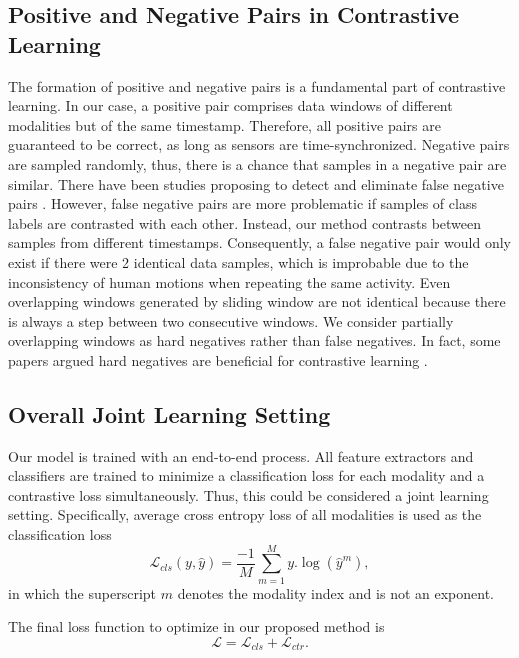 \documentclass[conference]{IEEEtran}
\begin{document}
\subsection{Positive and Negative Pairs in Contrastive Learning}
The formation of positive and negative pairs is a fundamental part of contrastive learning. In our case, a positive pair comprises data windows of different modalities but of the same timestamp. Therefore, all positive pairs are guaranteed to be correct, as long as sensors are time-synchronized. Negative pairs are sampled randomly, thus, there is a chance that samples in a negative pair are similar. There have been studies proposing to detect and eliminate false negative pairs \cite{Huynh2022,Wang2023}. However, false negative pairs are more problematic if samples of class labels are contrasted with each other. Instead, our method contrasts between samples from different timestamps. Consequently, a false negative pair would only exist if there were 2 identical data samples, which is improbable due to the inconsistency of human motions when repeating the same activity. Even overlapping windows generated by sliding window are not identical because there is always a step between two consecutive windows. We consider partially overlapping windows as hard negatives rather than false negatives. In fact, some papers argued hard negatives are beneficial for contrastive learning \cite{Robinson2021,Deldari2022}.

\subsection{Overall Joint Learning Setting}
Our model is trained with an end-to-end process. All feature extractors and classifiers are trained to minimize a classification loss for each modality and a contrastive loss simultaneously. Thus, this could be considered a joint learning setting. Specifically, average cross entropy loss of all modalities is used as the classification loss
\begin{equation}
    \mathcal{L}_{cls}(y,\hat{y}) = \frac{-1}{M} \sum_{m=1}^M y.\log(\hat{y}^m),
\end{equation}
in which the superscript $m$ denotes the modality index and is not an exponent.

The final loss function to optimize in our proposed method is
\begin{equation}
    \mathcal{L} = \mathcal{L}_{cls} + \mathcal{L}_{ctr}.
\end{equation}
\end{document}

